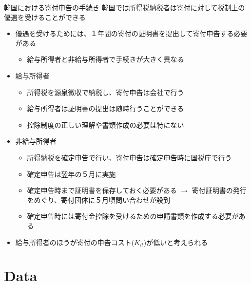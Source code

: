 \documentclass[
  ignorenonframetext,
  aspectratio=169,
]{beamer}
\providecommand{\tightlist}{%
  \setlength{\itemsep}{0pt}\setlength{\parskip}{0pt}}
\begin{document}
\begin{frame}{韓国における寄付申告の手続き}
\protect\hypertarget{ux97d3ux56fdux306bux304aux3051ux308bux5bc4ux4ed8ux7533ux544aux306eux624bux7d9aux304d}{}
韓国では所得税納税者は寄付に対して税制上の優遇を受けることができる

\begin{itemize}
\tightlist
\item
  優遇を受けるためには、１年間の寄付の証明書を提出して寄付申告する必要がある

  \begin{itemize}
  \tightlist
  \item
    給与所得者と非給与所得者で手続きが大きく異なる
  \end{itemize}
\item
  給与所得者

  \begin{itemize}
  \tightlist
  \item
    所得税を源泉徴収で納税し、寄付申告は会社で行う
  \item
    給与所得者は証明書の提出は随時行うことができる
  \item
    控除制度の正しい理解や書類作成の必要は特にない
  \end{itemize}
\item
  非給与所得者

  \begin{itemize}
  \tightlist
  \item
    所得納税を確定申告で行い、寄付申告は確定申告時に国税庁で行う
  \item
    確定申告は翌年の５月に実施
  \item
    確定申告時まで証明書を保存しておく必要がある \(\to\) 寄付証明書の発行をめぐり、寄付団体に５月頃問い合わせが殺到
  \item
    確定申告時には寄付金控除を受けるための申請書類を作成する必要がある
  \end{itemize}
\item
  給与所得者のほうが寄付の申告コスト(\(K_{it}\))が低いと考えられる
\end{itemize}
\end{frame}

\hypertarget{data}{%
\section{Data}\label{data}}
\end{document}
